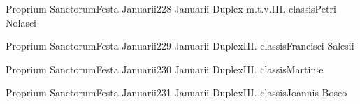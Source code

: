 \documentclass[liber-responsorialis.tex]{subfiles}
\begin{document}
	{Proprium Sanctorum}{Festa Januarii}{2}{28 Januarii}
	{Duplex m.t.v.}{III. classis}{Petri Nolasci}
	{\conprubric}
	{\respdetemp}

	{Proprium Sanctorum}{Festa Januarii}{2}{29 Januarii}
	{Duplex}{III. classis}{Francisci Salesii}
	{\copodorubric}
	{\respdetemp}

	{Proprium Sanctorum}{Festa Januarii}{2}{30 Januarii}
	{Duplex}{III. classis}{Martinæ}
	{\vmrubric}
	{\respdetemp}

	{Proprium Sanctorum}{Festa Januarii}{2}{31 Januarii}
	{Duplex}{III. classis}{Joannis Bosco}
	{\conprubric}
	{\respdetemp}
\end{document}
